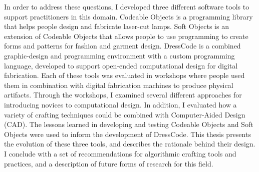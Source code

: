 In order to address these questions, I developed three different software tools to support practitioners in this domain. Codeable Objects is a programming library that helps people design and fabricate laser-cut lamps. Soft Objects is an extension of Codeable Objects that allows people to use programming to create forms and patterns for fashion and garment design. DressCode is a combined graphic-design and programming environment with a custom programming language, developed to support open-ended computational design for digital fabrication. Each of these tools was evaluated in workshops where people used them in combination with digital fabrication machines to produce physical artifacts. Through the workshops, I examined several different approaches for introducing novices to computational design. In addition, I evaluated how a variety of crafting techniques could be combined with Computer-Aided Design (CAD). The lessons learned in developing and testing Codeable Objects and Soft Objects were used to inform the development of DressCode. This thesis presents the evolution of these three tools, and describes the rationale behind their design. I conclude with a set of recommendations for algorithmic crafting tools and practices, and a description of future forms of research for this field.